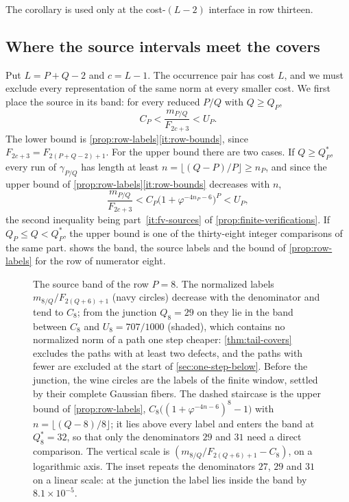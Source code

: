 The corollary is used only at the cost-$(L-2)$ interface in row thirteen.

\subsection{Where the source intervals meet the covers}

Put $L=P+Q-2$ and $c=L-1$. The occurrence pair has cost $L$, and we must
exclude every representation of the same norm at every smaller cost. We
first place the source in its band: for every reduced $P/Q$ with
$Q\geqslant Q_P$,
\begin{equation}\label{eq:joined-source-band}
 C_P<\frac{m_{P/Q}}{F_{2c+3}}<U_P.
\end{equation}
The lower bound is \cref{prop:row-labels}\ref{it:row-bounds}, since $F_{2c+3}=F_{2(P+Q-2)+1}$.
For the upper bound there are two cases. If $Q\geqslant Q^*_P$, every run of
$\gamma_{P/Q}$ has length at least $n=\lfloor(Q-P)/P\rfloor\geqslant n_P$, and since the
upper bound of \cref{prop:row-labels}\ref{it:row-bounds} decreases with $n$,
\begin{equation}\label{eq:junction-source}
 \frac{m_{P/Q}}{F_{2c+3}}<C_P\bigl(1+\varphi^{-4n_P-6}\bigr)^P<U_P ,
\end{equation}
the second inequality being part~\ref{it:fv-sources} of \cref{prop:finite-verifications}.
If $Q_P\leqslant Q<Q^*_P$, the upper bound is one of the thirty-eight integer
comparisons of the same part.  shows the band, the source
labels and the bound of \cref{prop:row-labels} for the row of numerator
eight.

\begin{figure}[tb]
\centering

\caption{The source band of the row $P=8$. The normalized labels
$m_{8/Q}/F_{2(Q+6)+1}$ (navy circles) decrease with the denominator and tend
to $C_8$; from the junction $Q_8=29$ on they lie in the band between $C_8$ and
$U_8=707/1000$ (shaded), which contains no normalized norm of a path one
step cheaper: \cref{thm:tail-covers} excludes the paths with at least two
defects, and the paths with fewer are excluded at the start of
\cref{sec:one-step-below}. Before the junction, the wine
circles are the labels of the finite window, settled by their complete
Gaussian fibers. The dashed staircase is the upper bound of
\cref{prop:row-labels}, $C_8\bigl((1+\varphi^{-4n-6})^8-1\bigr)$ with
$n=\lfloor(Q-8)/8\rfloor$; it lies above every label and enters the band at
$Q^*_8=32$, so that only the denominators $29$ and $31$ need a direct
comparison. The vertical scale is $(m_{8/Q}/F_{2(Q+6)+1}-C_8)$, on a
logarithmic axis. The inset repeats the denominators $27$, $29$ and $31$ on a
linear scale: at the junction the label lies inside the band by
$8.1\times10^{-5}$.}
\label{fig:junction}
\end{figure}


